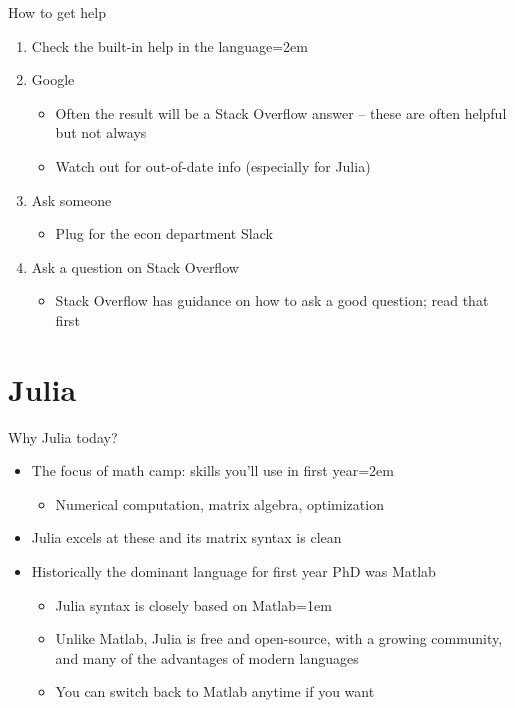 \documentclass{beamer}
\begin{document}
\begin{frame}{How to get help}

\begin{enumerate}
    \item Check the built-in help in the language\itemsep=2em
    \item Google
    \begin{itemize}
        \item Often the result will be a Stack Overflow answer -- these are often helpful but not always
        \item Watch out for out-of-date info (especially for Julia)
    \end{itemize}
    \item Ask someone
    \begin{itemize}
        \item Plug for the econ department Slack
    \end{itemize}
    \item Ask a question on Stack Overflow
    \begin{itemize}
        \item Stack Overflow has guidance on how to ask a good question; read that first
    \end{itemize}
\end{enumerate}
\end{frame}

\section{Julia}

\begin{frame}{Why Julia today?}
\begin{itemize}
    \item The focus of math camp: skills you'll use in first year\itemsep=2em
    \begin{itemize}
      \item Numerical computation, matrix algebra, optimization
    \end{itemize}
    \item Julia excels at these and its matrix syntax is clean
    \item<2-> Historically the dominant language for first year PhD was Matlab
    \begin{itemize}
        \item Julia syntax is closely based on Matlab\itemsep=1em
        \item Unlike Matlab, Julia is free and open-source, with a growing community, and many of the advantages of modern languages
        \item You can switch back to Matlab anytime if you want
    \end{itemize}
\end{itemize}
\end{frame}
\end{document}
